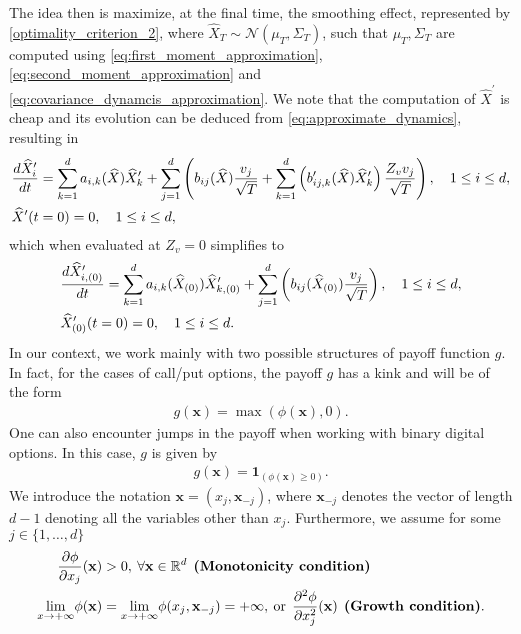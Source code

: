 The idea then is maximize, at the final time, the smoothing effect, represented by \eqref{optimality_criterion_2}, where $\hat{X}_T \sim \mathcal{N}(\mu_T, \Sigma_T)$, such that $\mu_T, \Sigma_T$ are computed using   \eqref{eq:first_moment_approximation}, \eqref{eq:second_moment_approximation} and \eqref{eq:covariance_dynamcis_approximation}. We note that the computation of $\hat{X}^\prime$ is cheap and its evolution can be deduced from \eqref{eq:approximate_dynamics}, resulting in
\begin{align*}
&\frac{d\widehat{X}^\prime_i}{dt}=\sum_{k=1}^d a_{i,k}(\widehat{X}) \widehat{X}^\prime_k+\sum_{j=1}^d  \left(b_{ij}(\widehat{X})\frac{ v_j}{\sqrt{T}}+ \sum_{k=1}^d \left(b^\prime_{ij,k}(\widehat{X}) \widehat{X}^\prime_k \right) \frac{Z_v v_j}{\sqrt{T}}\right), \quad  1 \le i \le d , \nonumber\\
&\widehat{X}^\prime(t=0)=0, \quad  1 \le i \le d ,
\end{align*}
which when evaluated at $Z_v=0$ simplifies to
\begin{align*}
&\frac{d\widehat{X}^\prime_{i,(0)}}{dt}=\sum_{k=1}^d a_{i,k}(\widehat{X}_{(0)}) \widehat{X}^\prime_{k,(0)}+\sum_{j=1}^d  \left(b_{ij}(\widehat{X}_{(0)})\frac{ v_j}{\sqrt{T}}\right), \quad  1 \le i \le d , \nonumber\\
&\widehat{X}_{(0)}^\prime(t=0)=0, \quad  1 \le i \le d .
\end{align*}
In our context, we work mainly with two possible structures of payoff function $g$. In fact, for the cases of call/put options, the payoff $g$ has a kink and  will be of the form 
\begin{align}\label{eq:call_option}
g(\mathbf{x})=\max(\phi(\mathbf{x}),0).
\end{align}
One can also encounter jumps in the payoff when working with binary digital options. In this case, $g$ is given by 
\begin{align}\label{eq:binary_option}
	g(\mathbf{x})=\mathbf{1}_{(\phi(\mathbf{x}) \ge 0)}.
\end{align}
We introduce the notation $\mathbf{x}=(x_j,\mathbf{x}_{-j})$, where $\mathbf{x}_{-j}$ denotes the vector of length $d-1$ denoting all the variables other than $x_j$. Furthermore, we assume for some $j \in \{1,\dots,d\}$
\begin{align}
	\frac{\partial \phi}{\partial x_j}(\mathbf{x}) &>0,\: \forall \mathbf{x} \in \mathbb{R}^d \: \: \textbf{(Monotonicity condition)}  \label{assump:Monotonicity condition}\\
	\underset{x \rightarrow +\infty}{\lim} \phi(\mathbf{x})&=\underset{x \rightarrow +\infty}{\lim} \phi(x_j,\mathbf{x}_{-j})=+\infty, \: \text{or} \:\: \frac{\partial^2 \phi} {\partial x_j^2}(\mathbf{x}) \: \: \textbf{(Growth condition)}  \label{assump:Growth condition} .
\end{align}
